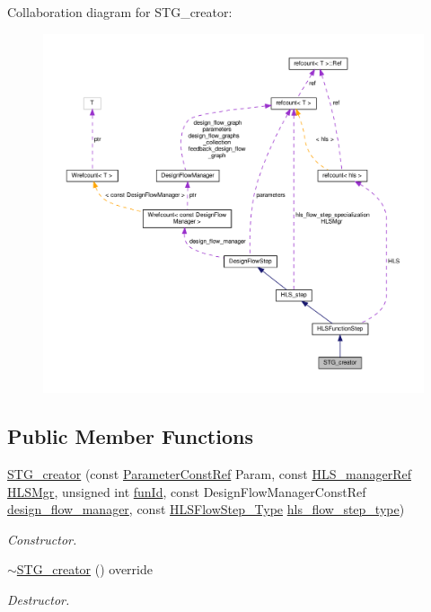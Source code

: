 Collaboration diagram for S\+T\+G\+\_\+creator\+:
\nopagebreak
\begin{figure}[H]
\begin{center}
\leavevmode
\includegraphics[width=350pt]{d5/d1c/classSTG__creator__coll__graph}
\end{center}
\end{figure}
\subsection*{Public Member Functions}
\begin{DoxyCompactItemize}
\item 
\hyperlink{classSTG__creator_a7d9a3b78fc88a228a77b70a7bc5a576d}{S\+T\+G\+\_\+creator} (const \hyperlink{Parameter_8hpp_a37841774a6fcb479b597fdf8955eb4ea}{Parameter\+Const\+Ref} Param, const \hyperlink{hls__manager_8hpp_acd3842b8589fe52c08fc0b2fcc813bfe}{H\+L\+S\+\_\+manager\+Ref} \hyperlink{classHLS__step_ade85003a99d34134418451ddc46a18e9}{H\+L\+S\+Mgr}, unsigned int \hyperlink{classHLSFunctionStep_a3e6434fd86c698b0c70520b859bff5b0}{fun\+Id}, const Design\+Flow\+Manager\+Const\+Ref \hyperlink{classDesignFlowStep_ab770677ddf087613add30024e16a5554}{design\+\_\+flow\+\_\+manager}, const \hyperlink{hls__step_8hpp_ada16bc22905016180e26fc7e39537f8d}{H\+L\+S\+Flow\+Step\+\_\+\+Type} \hyperlink{classHLS__step_aefd59af15346ec3f10bf12bd756e6777}{hls\+\_\+flow\+\_\+step\+\_\+type})
\begin{DoxyCompactList}\small\item\em Constructor. \end{DoxyCompactList}\item 
\hyperlink{classSTG__creator_aefc59a7d50edb1dd2990e8589fae52ba}{$\sim$\+S\+T\+G\+\_\+creator} () override
\begin{DoxyCompactList}\small\item\em Destructor. \end{DoxyCompactList}\end{DoxyCompactItemize}

